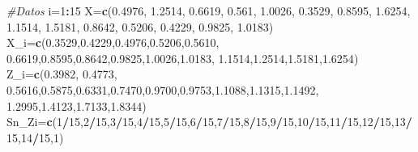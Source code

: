 \documentclass[
  a4paper,
  oneside,
  openany]{book}
\newenvironment{Shaded}{\begin{snugshade}}{\end{snugshade}}
\newcommand{\CommentTok}[1]{\textcolor[rgb]{0.56,0.35,0.01}{\textit{#1}}}
\newcommand{\DecValTok}[1]{\textcolor[rgb]{0.00,0.00,0.81}{#1}}
\newcommand{\FloatTok}[1]{\textcolor[rgb]{0.00,0.00,0.81}{#1}}
\newcommand{\KeywordTok}[1]{\textcolor[rgb]{0.13,0.29,0.53}{\textbf{#1}}}
\newcommand{\NormalTok}[1]{#1}
\newcommand{\OperatorTok}[1]{\textcolor[rgb]{0.81,0.36,0.00}{\textbf{#1}}}
\begin{document}
\begin{Shaded}
\begin{Highlighting}[]
\CommentTok{\#Datos}
\NormalTok{i=}\DecValTok{1}\OperatorTok{:}\DecValTok{15}
\NormalTok{X=}\KeywordTok{c}\NormalTok{(}\FloatTok{0.4976}\NormalTok{, }\FloatTok{1.2514}\NormalTok{, }\FloatTok{0.6619}\NormalTok{, }\FloatTok{0.561}\NormalTok{, }\FloatTok{1.0026}\NormalTok{, }\FloatTok{0.3529}\NormalTok{, }\FloatTok{0.8595}\NormalTok{, }\FloatTok{1.6254}\NormalTok{,}
                             \FloatTok{1.1514}\NormalTok{, }\FloatTok{1.5181}\NormalTok{, }\FloatTok{0.8642}\NormalTok{, }\FloatTok{0.5206}\NormalTok{, }\FloatTok{0.4229}\NormalTok{, }\FloatTok{0.9825}\NormalTok{, }\FloatTok{1.0183}\NormalTok{)}
\NormalTok{X\_i=}\KeywordTok{c}\NormalTok{(}\FloatTok{0.3529}\NormalTok{,}\FloatTok{0.4229}\NormalTok{,}\FloatTok{0.4976}\NormalTok{,}\FloatTok{0.5206}\NormalTok{,}\FloatTok{0.5610}\NormalTok{, }\FloatTok{0.6619}\NormalTok{,}\FloatTok{0.8595}\NormalTok{,}\FloatTok{0.8642}\NormalTok{,}\FloatTok{0.9825}\NormalTok{,}\FloatTok{1.0026}\NormalTok{,}\FloatTok{1.0183}\NormalTok{,}
      \FloatTok{1.1514}\NormalTok{,}\FloatTok{1.2514}\NormalTok{,}\FloatTok{1.5181}\NormalTok{,}\FloatTok{1.6254}\NormalTok{)}
\NormalTok{Z\_i=}\KeywordTok{c}\NormalTok{(}\FloatTok{0.3982}\NormalTok{, }\FloatTok{0.4773}\NormalTok{, }\FloatTok{0.5616}\NormalTok{,}\FloatTok{0.5875}\NormalTok{,}\FloatTok{0.6331}\NormalTok{,}\FloatTok{0.7470}\NormalTok{,}\FloatTok{0.9700}\NormalTok{,}\FloatTok{0.9753}\NormalTok{,}\FloatTok{1.1088}\NormalTok{,}\FloatTok{1.1315}\NormalTok{,}\FloatTok{1.1492}\NormalTok{,}
      \FloatTok{1.2995}\NormalTok{,}\FloatTok{1.4123}\NormalTok{,}\FloatTok{1.7133}\NormalTok{,}\FloatTok{1.8344}\NormalTok{) }
\NormalTok{Sn\_Zi=}\KeywordTok{c}\NormalTok{(}\DecValTok{1}\OperatorTok{/}\DecValTok{15}\NormalTok{,}\DecValTok{2}\OperatorTok{/}\DecValTok{15}\NormalTok{,}\DecValTok{3}\OperatorTok{/}\DecValTok{15}\NormalTok{,}\DecValTok{4}\OperatorTok{/}\DecValTok{15}\NormalTok{,}\DecValTok{5}\OperatorTok{/}\DecValTok{15}\NormalTok{,}\DecValTok{6}\OperatorTok{/}\DecValTok{15}\NormalTok{,}\DecValTok{7}\OperatorTok{/}\DecValTok{15}\NormalTok{,}\DecValTok{8}\OperatorTok{/}\DecValTok{15}\NormalTok{,}\DecValTok{9}\OperatorTok{/}\DecValTok{15}\NormalTok{,}\DecValTok{10}\OperatorTok{/}\DecValTok{15}\NormalTok{,}\DecValTok{11}\OperatorTok{/}\DecValTok{15}\NormalTok{,}\DecValTok{12}\OperatorTok{/}\DecValTok{15}\NormalTok{,}\DecValTok{13}\OperatorTok{/}\DecValTok{15}\NormalTok{,}\DecValTok{14}\OperatorTok{/}\DecValTok{15}\NormalTok{,}\DecValTok{1}\NormalTok{)}

\end{Highlighting}
\end{Shaded}
\end{document}
